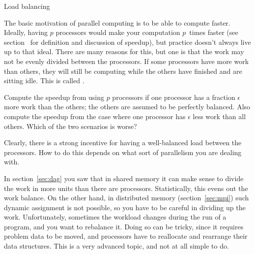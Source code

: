  {Load balancing}

The basic motivation of parallel computing is to be able to compute
faster.  Ideally, having $p$ processors would make your computation
$p$~times faster (see section~ for
definition and discussion of speedup), but practice doesn't always
live up to that ideal. There are many reasons for this, but one is
that the work may not be evenly divided between the processors.  If
some processors have more work than others, they will still be
computing while the others have finished and are sitting idle. This is
called .

\begin{exercise}
  Compute the speedup from using $p$ processors if one processor has a
  fraction $\epsilon$ more work than the others; the others are
  assumed to be perfectly balanced. Also compute the speedup from the
  case where one processor has $\epsilon$ less work than all
  others. Which of the two scenarios is worse?
\end{exercise}

Clearly, there is a strong incentive for having a well-balanced
load between the processors. How to do this depends on what sort
of parallelism you are dealing with.

In section~\ref{sec:dag} you saw that in shared memory it can make
sense to divide the work in more units than there are processors.
Statistically, this evens out the work balance.
On the other hand, in distributed memory (section~\ref{sec:mpi})
such dynamic assignment is not possible, so you have to be careful
in dividing up the work.
Unfortunately, sometimes the workload
changes during the run of a program, and you want to rebalance it.
Doing so can be tricky, since it requires problem data to be moved,
and processors have to reallocate and rearrange their data structures.
This is a very advanced topic, and not at all simple to do.

\endinput
\begin{review}
  \Level 1 {Review questions}
  
\end{review}
